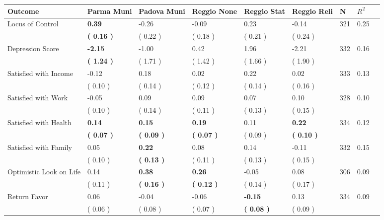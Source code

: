 \begin{tabular}{L{6.2cm} C{1.8cm} C{1.8cm} C{1.8cm} C{1.8cm} C{1.8cm} C{1.8cm} C{0.3cm} C{0.3cm}}
\toprule
 \textbf{Outcome} & \textbf{Parma Muni} & \textbf{Padova Muni} & \textbf{Reggio None} & \textbf{Reggio Stat} & \textbf{Reggio Reli} & \textbf{N} & \textbf{$ R^2$} \\
\midrule
Locus of Control & \textbf{     0.39} &     -0.26 &     -0.09 &      0.23 &     -0.14  & 321 &       0.25 \\ 
 & \textbf{(     0.16 )} & (     0.22 ) & (     0.18 ) & (     0.21 ) & (     0.24 )  & \\
Depression Score & \textbf{    -2.15} &     -1.00 &      0.42 &      1.96 &     -2.21  & 332 &       0.16 \\ 
 & \textbf{(     1.24 )} & (     1.71 ) & (     1.42 ) & (     1.66 ) & (     1.90 )  & \\
Satisfied with Income &     -0.12 &      0.18 &      0.02 &      0.22 &      0.02  & 333 &       0.13 \\ 
 & (     0.10 ) & (     0.14 ) & (     0.12 ) & (     0.14 ) & (     0.16 )  & \\
Satisfied with Work &     -0.05 &      0.09 &      0.09 &      0.07 &      0.10  & 328 &       0.10 \\ 
 & (     0.10 ) & (     0.14 ) & (     0.11 ) & (     0.13 ) & (     0.15 )  & \\
Satisfied with Health & \textbf{     0.14} & \textbf{     0.15} & \textbf{     0.19} &      0.11 & \textbf{     0.22}  & 334 &       0.12 \\ 
 & \textbf{(     0.07 )} & \textbf{(     0.09 )} & \textbf{(     0.07 )} & (     0.09 ) & \textbf{(     0.10 )}  & \\
Satisfied with Family &      0.05 & \textbf{     0.22} &      0.08 &      0.14 &     -0.11  & 332 &       0.15 \\ 
 & (     0.10 ) & \textbf{(     0.13 )} & (     0.11 ) & (     0.13 ) & (     0.15 )  & \\
Optimistic Look on Life &      0.14 & \textbf{     0.38} & \textbf{     0.26} &     -0.05 &      0.08  & 306 &       0.09 \\ 
 & (     0.11 ) & \textbf{(     0.16 )} & \textbf{(     0.12 )} & (     0.14 ) & (     0.17 )  & \\
Return Favor &      0.06 &     -0.04 &     -0.06 & \textbf{    -0.15} &      0.13  & 334 &       0.09 \\ 
 & (     0.06 ) & (     0.08 ) & (     0.07 ) & \textbf{(     0.08 )} & (     0.09 )  & \\

\end{tabular}
